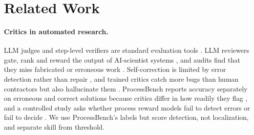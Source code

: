 \documentclass[letterpaper]{article} %
\begin{document}
\section{Related Work}
\label{sec:related}

\paragraph{Critics in automated research.} LLM judges and step-level verifiers are standard evaluation tools \citep{zheng2023judging,lightman2024verify}. LLM reviewers gate, rank and reward the output of AI-scientist systems \citep{lu2024aiscientist,yamada2025aiscientistv2,weng2025cycleresearcher,biswas2026aaai}, and audits find that they miss fabricated or erroneous work \citep{jiang2026badscientist,son2025spot}. Self-correction is limited by error detection rather than repair \citep{huang2024cannot,tyen2024llms}, and trained critics catch more bugs than human contractors but also hallucinate them \citep{mcaleese2024critics}. ProcessBench reports accuracy separately on erroneous and correct solutions because critics differ in how readily they flag \citep{zheng2025processbench}, and a controlled study asks whether process reward models fail to detect errors or fail to decide \citep{anon2026prm}. We use ProcessBench's labels but score detection, not localization, and separate skill from threshold.
\end{document}
